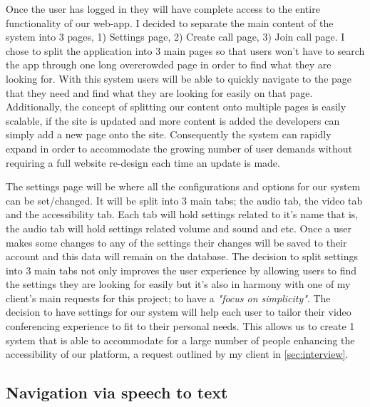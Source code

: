 Once the user has logged in they will have complete access to 
the entire functionality of our web-app. I decided to separate
the main content of the system into 3 pages, 1) Settings page,
2) Create call page, 3) Join call page. I chose to split the 
application into 3 main pages so that users won't have to 
search the app through one long overcrowded page in order to 
find what they are looking for. With this system users will be
able to quickly navigate to the page that they need and find 
what they are looking for easily on that page. Additionally, 
the concept of splitting our content onto multiple pages is 
easily scalable, if the site is updated and more content is 
added the developers can simply add a new page onto the site.
Consequently the system can rapidly expand in order to 
accommodate the growing number of user demands without
requiring a full website re-design each time an update is 
made. \\ \vspace{0.2cm}

The settings page will be where all the configurations and 
options for our system can be set/changed. It will be split
into 3 main tabs; the audio tab, the video tab and the 
accessibility tab. Each tab will hold settings related to it's
name that is, the audio tab will hold settings related volume
and sound and etc. Once a user makes some changes to any of the
settings their changes will be saved to their account and this 
data will remain on the database. The decision to split 
settings into 3 main tabs not only improves the user experience
by allowing users to find the settings they are looking for
easily but it's also in harmony with one of my client's main 
requests for this project; to have a \textit{"focus on 
simplicity"}. The decision to have settings for our system
will help each user to tailor their video conferencing
experience to fit to their personal needs. This allows us to 
create 1 system that is able to accommodate for a large 
number of people enhancing the accessibility of our platform, 
a request outlined by my client in \ref{sec:interview}. 

\subsection{Navigation via speech to text}

